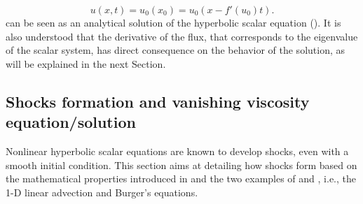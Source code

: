 %
\begin{equation}\label{eq:ivp5_sct1b}
u(x,t) = u_0(x_0) = u_0(x - f'(u_0)t) .
\end{equation}
%
 can be seen as an analytical solution of the hyperbolic scalar equation (). It is also understood that the derivative of the flux, that corresponds to the eigenvalue of the scalar system, has direct consequence on the behavior of the solution, as will be explained in the next Section. %

\subsection{Shocks formation and vanishing viscosity equation/solution}\label{sec:shock_form_sct1b}
Nonlinear hyperbolic scalar equations are known to develop shocks, even with a smooth initial condition. This section aims at detailing how shocks form based on the mathematical properties introduced in  and the two examples of  and , i.e., the 1-D linear advection and Burger's equations.\\


